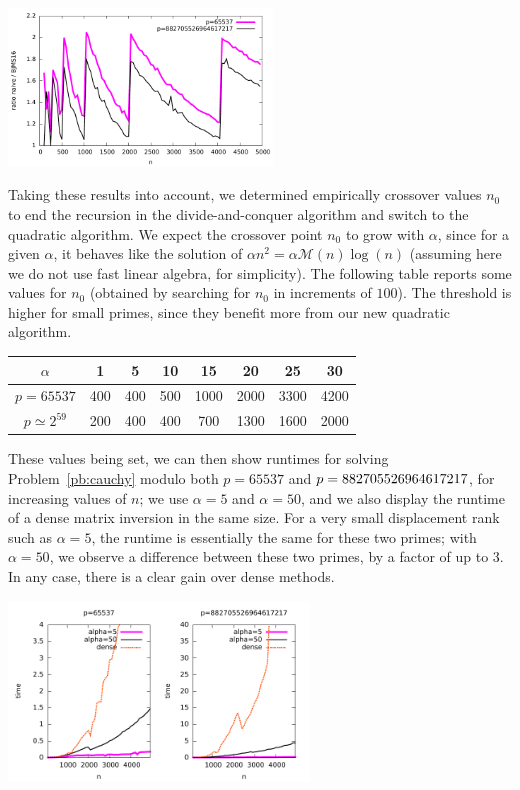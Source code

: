 \documentclass{sig-alternate}
\newcommand{\M}{\ensuremath{\mathscr{M}}}
\begin{document}
\includegraphics[width=7cm]{ratio-mul-matrix-eschost-desktop.pdf}

Taking these results into account, we determined empirically crossover
values $n_0$ to end the recursion in the divide-and-conquer algorithm
and switch to the quadratic algorithm. We expect the crossover point
$n_0$ to grow with $\alpha$, since for a given $\alpha$, it behaves
like the solution of $\alpha n^2 = \alpha \M(n) \log(n)$ (assuming
here we do not use fast linear algebra, for simplicity). The following
table reports some values for $n_0$ (obtained by searching for $n_0$
in increments of $100$).  The threshold is higher for small primes,
since they benefit more from our new quadratic algorithm.

\begin{center}
{\small
\begin{tabular}{|c||c|c|c|c|c|c|c|}\hline
  $\alpha$ & 1 & 5 & 10 & 15 & 20 & 25 &30 \\\hline\hline
$p=65537$  & 400 &400 &500  &1000  &2000  &3300  &4200 \\\hline
$p\simeq 2^{59}$  & 200 & 400 & 400 & 700 & 1300 & 1600 & 2000\\\hline
\end{tabular}
}
\end{center}

These values being set, we can then show runtimes for solving
Problem~\ref{pb:cauchy} modulo both $p=65537$ and
$p=8827055\-26964617217$, for increasing values of $n$; we use
$\alpha=5$ and $\alpha=50$, and we also display the runtime of a dense
matrix inversion in the same size. For a very small displacement rank
such as $\alpha=5$, the runtime is essentially the same for these two
primes; with $\alpha=50$, we observe a difference between these two
primes, by a factor of up to 3. In any case, there is a clear gain
over dense methods.

\includegraphics[width=8cm]{large_n-eschost-desktop.pdf}
\end{document}
